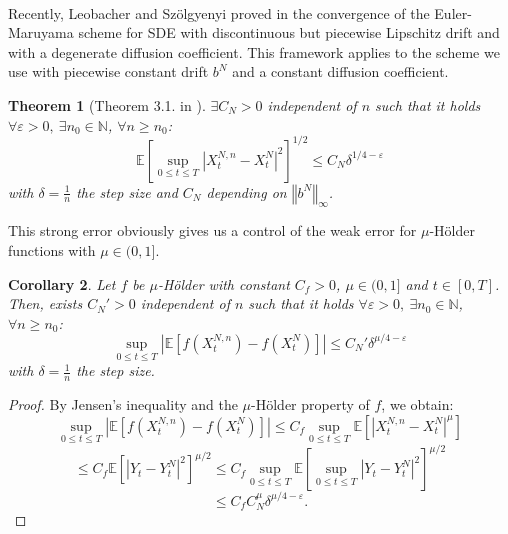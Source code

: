 \documentclass[11pt]{article}
\newtheorem{theo}{Theorem}
\newtheorem{cor}[theo]{Corollary}
\newcommand{\norme}[1]{\left\Vert #1\right\Vert}
\newcommand{\N}{\mathbb{N}}
\newcommand{\E}{\mathbb{E}}
\begin{document}
\paragraph{}
Recently, Leobacher and Szölgyenyi proved in \cite{Leo-Szo} the convergence of the Euler-Maruyama scheme for SDE with discontinuous but piecewise Lipschitz drift and with a degenerate diffusion coefficient. This framework applies to the scheme we use with piecewise constant drift $b^N$ and a constant diffusion coefficient.

\begin{theo}[Theorem 3.1. in \cite{Leo-Szo}]\label{leo}
    $\exists C_N>0$ independent of $n$ such that it holds  $\forall \varepsilon >0,\ \exists n_0\in\N$, $\forall n\geq n_0$:
    \begin{equation}
    \E\left[\underset{0\leq t\leq T}{\sup}\left|X^{N,n}_t-X^N_t\right|^2\right]^{1/2}\leq C_N\delta^{1/4-\varepsilon}
    \end{equation}
    with $\delta=\frac{1}{n}$ the step size and $C_N$ depending on $\norme{b^N}_\infty$.
\end{theo}

This strong error obviously gives us a control of the weak error for $\mu$-Hölder functions with $\mu\in(0,1]$.

\begin{cor}
    Let $f$ be $\mu$-Hölder with constant $C_f>0$, $\mu\in(0,1]$ and $t\in[0,T]$. Then, exists $C_N'>0$ independent of $n$ such that it holds  $\forall \varepsilon >0,\ \exists n_0\in\N$, $\forall n\geq n_0$:
    \begin{equation}
    \underset{0\leq t\leq T}{\sup}\left|\E\left[f\left(X_t^{N,n}\right)-f\left(X_t^N\right)\right]\right| \leq C_N'\delta^{\mu/4-\varepsilon}
    \end{equation}                       
    with $\delta=\frac{1}{n}$ the step size.
\end{cor}

\begin{proof}
    By Jensen's inequality and the $\mu$-Hölder property of $f$, we obtain:
    \begin{equation*}
    \underset{0\leq t\leq T}{\sup}\left|\E\left[f\left(X_t^{N,n}\right)-f\left(X_t^N\right)\right]\right| \leq C_f \underset{0\leq t\leq T}{\sup} \E\left[\left|X_t^{N,n}-X_t^N\right|^\mu\right]
    \end{equation*}
    \begin{equation*}
    \leq  C_f  \E\left[\left|Y_t-Y_t^N\right|^2\right]^{\mu/2} \leq  C_f  \underset{0\leq t\leq T}{\sup}\E\left[\underset{0\leq t\leq T}{\sup}\left|Y_t-Y_t^N\right|^2\right]^{\mu/2}
    \end{equation*}
    \begin{equation*}
    \leq C_f  C_N^\mu\delta^{\mu/4-\varepsilon}.
    \end{equation*}
\end{proof}
\end{document}
